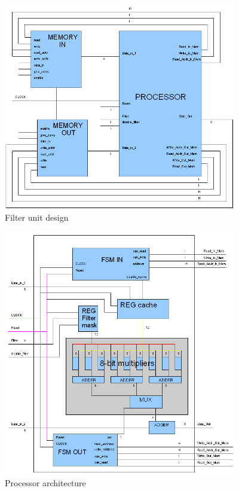 \documentclass[11pt,a4paper]{article}
\begin{document}
\begin{figure}[h]
	\centering
		\includegraphics[width=4in]{./images/processador.PNG}
	\caption{Filter unit design}	\label{fig:proc}
\end{figure}

\begin{figure}[h]
	\centering
		\includegraphics[width=4in]{./images/insideproc.PNG}
	\caption{Processor architecture}	\label{fig:procdetail}
\end{figure}
\end{document}
